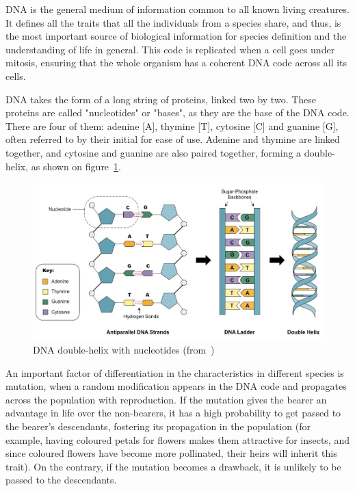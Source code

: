 
DNA is the general medium of information common to all known living creatures. It defines all the traits that all the individuals from a species share, and thus, is the most important source of biological information for species definition and the understanding of life in general. This code is replicated when a cell goes under mitosis, ensuring that the whole organism has a coherent DNA code across all its cells.

DNA takes the form of a long string of proteins, linked two by two. These proteins are called "nucleotides" or "bases", as they are the base of the DNA code. There are four of them: adenine [A], thymine [T], cytosine [C] and guanine [G], often referred to by their initial for ease of use. Adenine and thymine are linked together, and cytosine and guanine are also paired together, forming a double-helix, as shown on figure~\ref{fig:double-stranded-dnamed}.

\begin{figure}[h]
	\centering
	\includegraphics[width=1\linewidth]{double-stranded-dna_med}
	\caption{DNA double-helix with nucleotides (from~\cite{cornell:dnastructure})}
	\label{fig:double-stranded-dnamed}
\end{figure}


An important factor of differentiation in the characteristics in different species is mutation, when a random modification appears in the DNA code and propagates across the population with reproduction. If the mutation gives the bearer an advantage in life over the non-bearers, it has a high probability to get passed to the bearer's descendants, fostering its propagation in the population (for example, having coloured petals for flowers makes them attractive for insects, and since coloured flowers have become more pollinated, their heirs will inherit this trait). On the contrary, if the mutation becomes a drawback, it is unlikely to be passed to the descendants.

